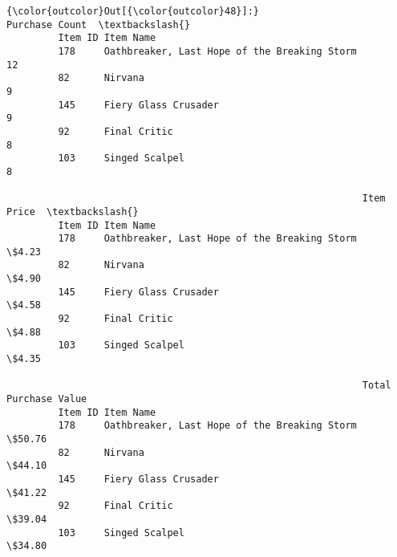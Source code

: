 \documentclass[11pt]{article}
\begin{document}
\begin{Verbatim}[commandchars=\\\{\}]
{\color{outcolor}Out[{\color{outcolor}48}]:}                                                       Purchase Count  \textbackslash{}
         Item ID Item Name                                                      
         178     Oathbreaker, Last Hope of the Breaking Storm              12   
         82      Nirvana                                                    9   
         145     Fiery Glass Crusader                                       9   
         92      Final Critic                                               8   
         103     Singed Scalpel                                             8   
         
                                                              Item Price  \textbackslash{}
         Item ID Item Name                                                 
         178     Oathbreaker, Last Hope of the Breaking Storm      \$4.23   
         82      Nirvana                                           \$4.90   
         145     Fiery Glass Crusader                              \$4.58   
         92      Final Critic                                      \$4.88   
         103     Singed Scalpel                                    \$4.35   
         
                                                              Total Purchase Value  
         Item ID Item Name                                                          
         178     Oathbreaker, Last Hope of the Breaking Storm               \$50.76  
         82      Nirvana                                                    \$44.10  
         145     Fiery Glass Crusader                                       \$41.22  
         92      Final Critic                                               \$39.04  
         103     Singed Scalpel                                             \$34.80  
\end{Verbatim}
            

    
    
    
    
\end{document}
